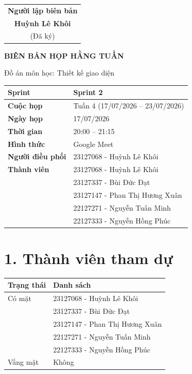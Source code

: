 \documentclass[11pt,a4paper]{article}
\begin{document}
\vspace{1.5cm}

\begin{flushright}
\begin{tabular}{c}
\textbf{Người lập biên bản}\\[2cm]
\textbf{Huỳnh Lê Khôi}\\
(Đã ký)
\end{tabular}
\end{flushright}


\newpage
\begin{center}
    {\Huge\bfseries BIÊN BẢN HỌP HẰNG TUẦN}

    \vspace{0.2cm}

    {\Large Đồ án môn học: Thiết kế giao diện}
\end{center}

\vspace{0.8cm}

\begin{tabularx}{\textwidth}{|>{\bfseries}p{4cm}|X|}
\hline
Sprint & Sprint 2 \\ \hline
Cuộc họp & Tuần 4 (17/07/2026 -- 23/07/2026) \\ \hline
Ngày họp & 17/07/2026 \\ \hline
Thời gian & 20:00 -- 21:15 \\ \hline
Hình thức & Google Meet \\ \hline
Người điều phối & 23127068 - Huỳnh Lê Khôi \\ \hline
Thành viên &
23127068 - Huỳnh Lê Khôi\\
&
23127337 - Bùi Đức Đạt\\
&
23127147 - Phan Thị Hương Xuân\\
&
22127271 - Nguyễn Tuấn Minh\\
&
22127333 - Nguyễn Hồng Phúc\\
\hline
\end{tabularx}

\vspace{0.8cm}


\section*{1. Thành viên tham dự}

\begin{tabularx}{\textwidth}{|p{4cm}|X|}
\hline
\rowcolor{gray!20}
\textbf{Trạng thái} & \textbf{Danh sách}\\
\hline
Có mặt &
23127068 - Huỳnh Lê Khôi\\
&
23127337 - Bùi Đức Đạt\\
&
23127147 - Phan Thị Hương Xuân\\
&
22127271 - Nguyễn Tuấn Minh\\
&
22127333 - Nguyễn Hồng Phúc\\
\hline
Vắng mặt & Không\\
\hline
\end{tabularx}
\end{document}
